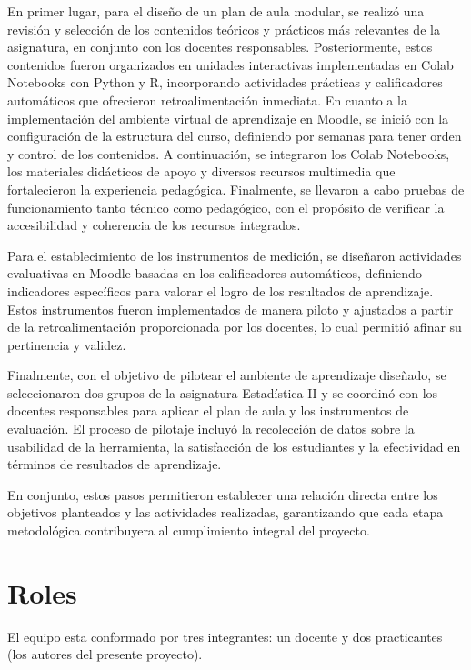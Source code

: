\documentclass[letter,oneside,12pt,spanish]{report}
\begin{document}
En primer lugar, para el diseño de un plan de aula modular, se realizó una revisión y selección de los contenidos teóricos y prácticos más relevantes de la asignatura, en conjunto con los docentes responsables. Posteriormente, estos contenidos fueron organizados en unidades interactivas implementadas en Colab Notebooks con Python y R, incorporando actividades prácticas y calificadores automáticos que ofrecieron retroalimentación inmediata.
En cuanto a la implementación del ambiente virtual de aprendizaje en Moodle, se inició con la configuración de la estructura del curso, definiendo por semanas para tener orden y control de los contenidos. A continuación, se integraron los Colab Notebooks, los materiales didácticos de apoyo y diversos recursos multimedia que fortalecieron la experiencia pedagógica. Finalmente, se llevaron a cabo pruebas de funcionamiento tanto técnico como pedagógico, con el propósito de verificar la accesibilidad y coherencia de los recursos integrados.

Para el establecimiento de los instrumentos de medición, se diseñaron actividades evaluativas en Moodle basadas en los calificadores automáticos, definiendo indicadores específicos para valorar el logro de los resultados de aprendizaje. Estos instrumentos fueron implementados de manera piloto y ajustados a partir de la retroalimentación proporcionada por los docentes, lo cual permitió afinar su pertinencia y validez.

Finalmente, con el objetivo de pilotear el ambiente de aprendizaje diseñado, se seleccionaron dos grupos de la asignatura Estadística II y se coordinó con los docentes responsables para aplicar el plan de aula y los instrumentos de evaluación. El proceso de pilotaje incluyó la recolección de datos sobre la usabilidad de la herramienta, la satisfacción de los estudiantes y la efectividad en términos de resultados de aprendizaje.

En conjunto, estos pasos permitieron establecer una relación directa entre los objetivos planteados y las actividades realizadas, garantizando que cada etapa metodológica contribuyera al cumplimiento integral del proyecto.


\section{Roles}

El equipo esta conformado por tres integrantes: un docente y dos practicantes (los autores del presente proyecto).
\end{document}
